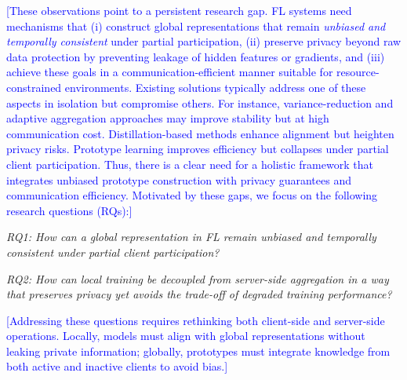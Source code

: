 \documentclass[lettersize,journal]{IEEEtran}
\newcommand{\todoa}[1]{\textcolor{blue}{[#1]}}
\begin{document}
\todoa{These observations point to a persistent research gap. FL systems need mechanisms that (i) construct global representations that remain \emph{unbiased and temporally consistent} under partial participation, (ii) preserve privacy beyond raw data protection by preventing leakage of hidden features or gradients, and (iii) achieve these goals in a communication-efficient manner suitable for resource-constrained environments. Existing solutions typically address one of these aspects in isolation but compromise others. For instance, variance-reduction and adaptive aggregation approaches may improve stability but at high communication cost. Distillation-based methods enhance alignment but heighten privacy risks. Prototype learning improves efficiency but collapses under partial client participation. Thus, there is a clear need for a holistic framework that integrates unbiased prototype construction with privacy guarantees and communication efficiency. Motivated by these gaps, we focus on the following research questions (RQs):}

\textit{RQ1: How can a global representation in FL remain unbiased and temporally consistent under partial client participation?}

\textit{RQ2: How can local training be decoupled from server-side aggregation in a way that preserves privacy yet avoids the trade-off of degraded training performance?}

\todoa{\noindent Addressing these questions requires rethinking both client-side and server-side operations. Locally, models must align with global representations without leaking private information; globally, prototypes must integrate knowledge from both active and inactive clients to avoid bias.} 
 
\end{document}
